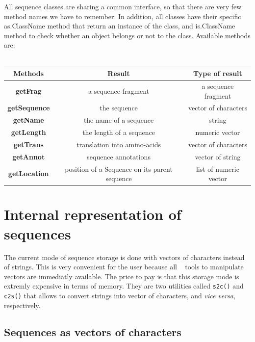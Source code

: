 \documentclass{article}
\begin{document}
All sequence classes are sharing a common interface, so that there are very few method names we have to remember. 
In addition, all classes have their specific as.ClassName method that return an instance of the class,
and is.ClassName method to check whether an object belongs or not to the class. 
Available methods are: 
\\
\\
\begin{tabular}{|@{} c @{}|@{} c @{}|@{} c @{}|}
\hline
{\bfseries Methods} & {\bfseries Result} & {\bfseries Type of result} \\
\hline \hline
{\bfseries getFrag} & a sequence fragment & a sequence fragment \\
\hline
{\bfseries getSequence} & the sequence & vector of characters \\
\hline
{\bfseries getName} & the name of a sequence & string \\
\hline
{\bfseries getLength} & the length of a sequence & numeric vector \\
\hline
{\bfseries getTrans} & translation into amino-acids & vector of characters \\
\hline
{\bfseries getAnnot} & sequence annotations & vector of string \\
\hline
{\bfseries getLocation} & position of a Sequence on its parent sequence & list of numeric vector \\
\hline
\end{tabular}

\section{Internal representation of sequences}

The current mode of sequence storage is done with vectors of characters instead of strings.
This is very convenient for the user because all \Rlogo{}~ tools to manipulate vectors are immediatly available. 
The price to pay is that this storage mode is extremly expensive in terms of memory.
They are two utilities called \texttt{s2c()} and \texttt{c2s()} that allows to convert strings into 
vector of characters, and \textit{vice versa}, respectively.

\subsection{Sequences as vectors of characters}
\end{document}
